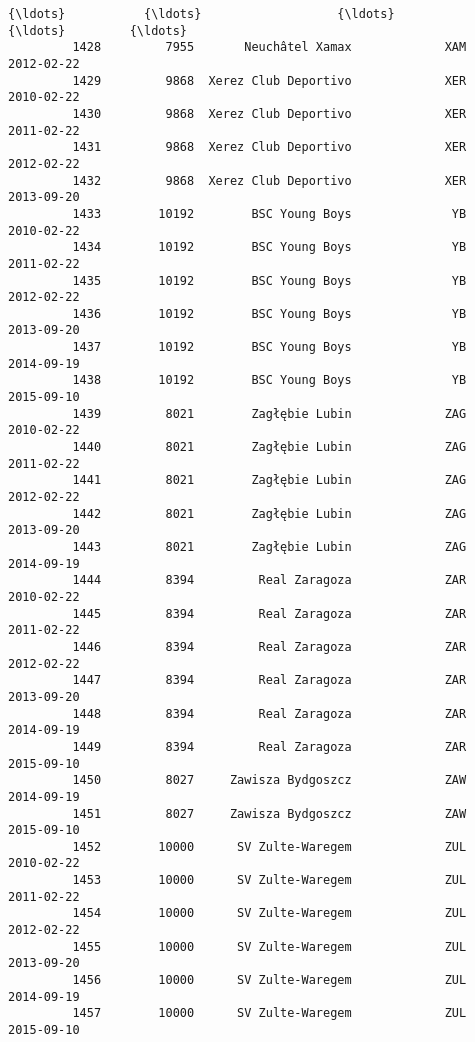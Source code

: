 \documentclass[11pt]{article}
\begin{document}
\begin{Verbatim}[commandchars=\\\{\}]
         {\ldots}           {\ldots}                   {\ldots}             {\ldots}         {\ldots}   
         1428         7955       Neuchâtel Xamax             XAM  2012-02-22   
         1429         9868  Xerez Club Deportivo             XER  2010-02-22   
         1430         9868  Xerez Club Deportivo             XER  2011-02-22   
         1431         9868  Xerez Club Deportivo             XER  2012-02-22   
         1432         9868  Xerez Club Deportivo             XER  2013-09-20   
         1433        10192        BSC Young Boys              YB  2010-02-22   
         1434        10192        BSC Young Boys              YB  2011-02-22   
         1435        10192        BSC Young Boys              YB  2012-02-22   
         1436        10192        BSC Young Boys              YB  2013-09-20   
         1437        10192        BSC Young Boys              YB  2014-09-19   
         1438        10192        BSC Young Boys              YB  2015-09-10   
         1439         8021        Zagłębie Lubin             ZAG  2010-02-22   
         1440         8021        Zagłębie Lubin             ZAG  2011-02-22   
         1441         8021        Zagłębie Lubin             ZAG  2012-02-22   
         1442         8021        Zagłębie Lubin             ZAG  2013-09-20   
         1443         8021        Zagłębie Lubin             ZAG  2014-09-19   
         1444         8394         Real Zaragoza             ZAR  2010-02-22   
         1445         8394         Real Zaragoza             ZAR  2011-02-22   
         1446         8394         Real Zaragoza             ZAR  2012-02-22   
         1447         8394         Real Zaragoza             ZAR  2013-09-20   
         1448         8394         Real Zaragoza             ZAR  2014-09-19   
         1449         8394         Real Zaragoza             ZAR  2015-09-10   
         1450         8027     Zawisza Bydgoszcz             ZAW  2014-09-19   
         1451         8027     Zawisza Bydgoszcz             ZAW  2015-09-10   
         1452        10000      SV Zulte-Waregem             ZUL  2010-02-22   
         1453        10000      SV Zulte-Waregem             ZUL  2011-02-22   
         1454        10000      SV Zulte-Waregem             ZUL  2012-02-22   
         1455        10000      SV Zulte-Waregem             ZUL  2013-09-20   
         1456        10000      SV Zulte-Waregem             ZUL  2014-09-19   
         1457        10000      SV Zulte-Waregem             ZUL  2015-09-10   
         

\end{Verbatim}
\end{document}
